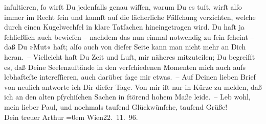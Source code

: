 \begin{ledgroupsized}[t]{13cm}
               inſultieren, ſo wirſt Du jedenfalls genau wiſſen, warum Du es tuſt, wirſt alſo immer
               im Recht ſein und kannſt auf die lächerliche Fälſchung verzichten, welche durch einen
               Kugelwechſel in klare Tatſachen hineingetragen wird. Du haſt ja ſchließlich auch
               bewieſen – nachdem das nun einmal notwendig zu ſein ſcheint – daß Du »Mut« haſt; alſo
               auch von dieſer Seite kann man nicht mehr an Dich heran. –\pend
           \pstart
           {\pb}Vielleicht haſt Du Zeit und Luſt, mir näheres
               mitzuteilen; Du begreifſt es, daß Deine Seelenzuſtände in den verſchiedenen Momenten
               mich auch aufs lebhafteſte intereſſieren, auch darüber ſage mir etwas. –\pend
           \pstart
           Auf Deinen lieben Brief von neulich antworte ich Dir dieſer Tage. Von mir iſt nur in
               Kürze zu melden, daß ich an den alten pſychiſchen Sachen in ſtörend hohem Maße
               leide. –\pend
           \pstart
           Leb wohl, mein lieber Paul, und nochmals tauſend Glückwünſche, tauſend Grüße!
               {\\[\baselineskip]}Dein treuer \spacefill\mbox{Arthur}\pend
           \leftskip=0em{}\pstart
           Wien22. 11. 96.\pend
           
         
         \endnumbering{}\end{ledgroupsized}  \newcommand{\dateiname}{L02686}\newcommand{\titel}{Arthur Schnitzler an Paul Goldmann, 22. 11. 1896}\newcommand{\editorInnen}{Martin Anton Müller und Laura Untner}
      